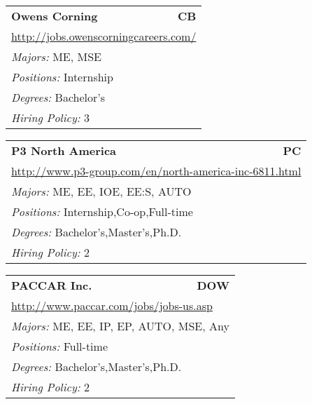 \documentclass[twoside]{article}
\begin{document}
\begin{center}
\begin{multicols}{3}
\begin{FlushLeft}
\begin{minipage}{.9\columnwidth}
\end{minipage}
 
\begin{minipage}{.9\columnwidth}\begin{tabularx}{.95\columnwidth}{Xr}
                 {\Large\bf Owens Corning} & {\Large\bf CB}\\
    \multicolumn{2}{p{.95\columnwidth}}{\url{http://jobs.owenscorningcareers.com/}}\\
    \multicolumn{2}{p{.95\columnwidth}}{\emph{Majors:} ME, MSE}\\
    \multicolumn{2}{p{.95\columnwidth}}{\emph{Positions:} Internship}\\
    \multicolumn{2}{p{.95\columnwidth}}{\emph{Degrees:} Bachelor's}\\
    \multicolumn{2}{p{.95\columnwidth}}{\emph{Hiring Policy:} 3}\\
    \end{tabularx}
    
\end{minipage}
 
\begin{minipage}{.9\columnwidth}\begin{tabularx}{.95\columnwidth}{Xr}
                 {\Large\bf P3 North America} & {\Large\bf PC}\\
    \multicolumn{2}{p{.95\columnwidth}}{\url{http://www.p3-group.com/en/north-america-inc-6811.html}}\\
    \multicolumn{2}{p{.95\columnwidth}}{\emph{Majors:} ME, EE, IOE, EE:S, AUTO}\\
    \multicolumn{2}{p{.95\columnwidth}}{\emph{Positions:} Internship,Co-op,Full-time}\\
    \multicolumn{2}{p{.95\columnwidth}}{\emph{Degrees:} Bachelor's,Master's,Ph.D.}\\
    \multicolumn{2}{p{.95\columnwidth}}{\emph{Hiring Policy:} 2}\\
    \end{tabularx}
    
\end{minipage}
 
\begin{minipage}{.9\columnwidth}\begin{tabularx}{.95\columnwidth}{Xr}
                 {\Large\bf PACCAR Inc.} & {\Large\bf DOW}\\
    \multicolumn{2}{p{.95\columnwidth}}{\url{http://www.paccar.com/jobs/jobs-us.asp}}\\
    \multicolumn{2}{p{.95\columnwidth}}{\emph{Majors:} ME, EE, IP, EP, AUTO, MSE, Any}\\
    \multicolumn{2}{p{.95\columnwidth}}{\emph{Positions:} Full-time}\\
    \multicolumn{2}{p{.95\columnwidth}}{\emph{Degrees:} Bachelor's,Master's,Ph.D.}\\
    \multicolumn{2}{p{.95\columnwidth}}{\emph{Hiring Policy:} 2}\\
    \end{tabularx}
    

\end{minipage}
\end{FlushLeft}
\end{multicols}
\end{center}
\end{document}
